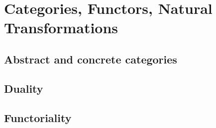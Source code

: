 \documentclass[main.tex]{subfiles}
\begin{document}
\chapter{Categories, Functors, Natural Transformations}
\section{Abstract and concrete categories}



\section{Duality}





% 
% 
\section{Functoriality}


\end{document}
